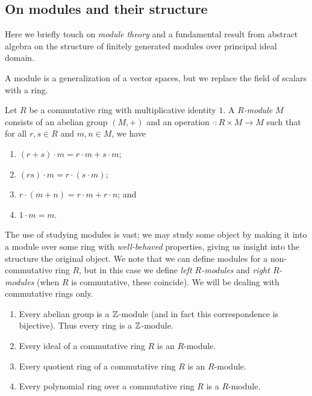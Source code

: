 \subsection{On modules and their structure}

Here we briefly touch on \emph{module theory} and a fundamental result from abstract algebra on the structure of finitely generated modules over principal ideal domain.

A module is a generalization of a vector spaces, but we replace the field of scalars with a ring.

\begin{definition}[Module] \label{def:module}
    Let $R$ be a commutative ring with multiplicative identity $1$. A \emph{$R$-module} $M$ consists of an abelian group $(M, +)$ and an operation $\cdot: R \times M \to M$ such that for all $r, s \in R$ and $m, n \in M$, we have
    \begin{enumerate}
        \item $(r + s) \cdot m = r \cdot m + s \cdot m$;
        \item $(rs) \cdot m = r \cdot (s \cdot m)$;
        \item $r \cdot (m + n) = r \cdot m + r \cdot n$; and
        \item $1 \cdot m = m$.
    \end{enumerate}
\end{definition}

The use of studying modules is vast; we may study some object by making it into a module over some ring with \emph{well-behaved} properties, giving us insight into the structure the original object. We note that we can define modules for a non-commutative ring $R$, but in this case we define \emph{left $R$-modules} and \emph{right $R$-modules} (when $R$ is commutative, these coincide). We will be dealing with commutative rings only.

\begin{example} \hspace{0em}
    \begin{enumerate}
        \item Every abelian group is a $\mathbb Z$-module (and in fact this correspondence is bijective). Thus every ring is a $\mathbb Z$-module.
        \item Every ideal of a commutative ring $R$ is an $R$-module.
        \item Every quotient ring of a commutative ring $R$ is an $R$-module.
        \item Every polynomial ring over a commutative ring $R$ is a $R$-module.
    \end{enumerate}
\end{example}

